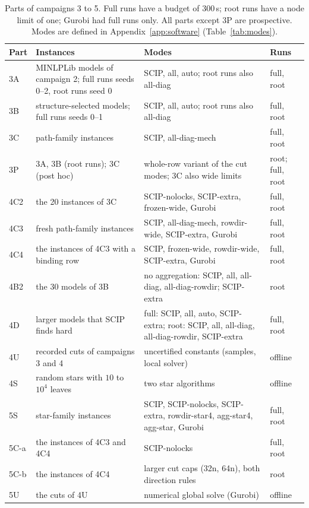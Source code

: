 \begin{table}[t]
\centering\footnotesize
\caption{Parts of campaigns 3 to 5. Full runs have a budget of 300\,s; root
runs have a node limit of one; Gurobi had full runs only. All parts except 3P
are prospective. Modes are defined in Appendix~\ref{app:software}
(Table~\ref{tab:modes}).}\label{tab:overview}
\begin{tabular}{@{}l>{\raggedright\arraybackslash}p{}>{\raggedright\arraybackslash}p{}l@{}}
\toprule
Part & Instances & Modes & Runs\\
\midrule
3A & 30 MINLPLib models of campaign 2; full runs seeds 0--2, root runs seed 0 & SCIP, all, auto; root runs also all-diag & full, root\\
3B & 30 structure-selected models; full runs seeds 0--1 & SCIP, all, auto; root runs also all-diag & full, root\\
3C & 20 path-family instances & SCIP, all-diag-mech & full, root\\
3P & 3A, 3B (root runs); 3C (post hoc) & whole-row variant of the cut modes; 3C also wide limits & root; full, root\\
\midrule
4C2 & the 20 instances of 3C & SCIP-nolocks, SCIP-extra, frozen-wide, Gurobi & full, root\\
4C3 & 20 fresh path-family instances & SCIP, all-diag-mech, rowdir-wide, SCIP-extra, Gurobi & full, root\\
4C4 & the instances of 4C3 with a binding row & SCIP, frozen-wide, rowdir-wide, SCIP-extra, Gurobi & full, root\\
4B2 & the 30 models of 3B & no aggregation: SCIP, all, all-diag, all-diag-rowdir; SCIP-extra & root\\
4D & 20 larger models that SCIP finds hard & full: SCIP, all, auto, SCIP-extra; root: SCIP, all, all-diag, all-diag-rowdir, SCIP-extra & full, root\\
4U & recorded cuts of campaigns 3 and 4 & uncertified constants (samples, local solver) & offline\\
4S & random stars with $10$ to $10^4$ leaves & two star algorithms & offline\\
\midrule
5S & 30 star-family instances & SCIP, SCIP-nolocks, SCIP-extra, rowdir-star4, agg-star4, agg-star, Gurobi & full, root\\
5C-a & the instances of 4C3 and 4C4 & SCIP-nolocks & full, root\\
5C-b & the instances of 4C4 & larger cut caps (32n, 64n), both direction rules & root\\
5U & the cuts of 4U & numerical global solve (Gurobi) & offline\\
\bottomrule
\end{tabular}
\end{table}

